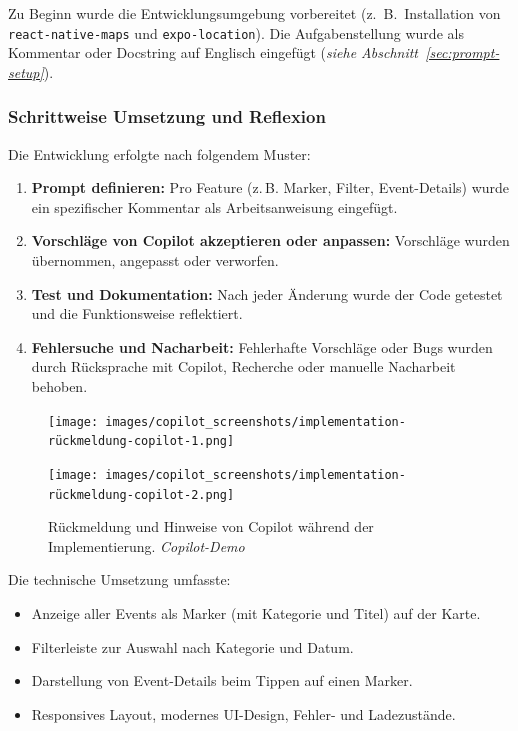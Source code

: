 Zu Beginn wurde die Entwicklungsumgebung vorbereitet (z.~B.\ Installation von
\texttt{react-native-maps} und \texttt{expo-location}). Die Aufgabenstellung
wurde als Kommentar oder Docstring auf Englisch eingefügt (\emph{siehe
      Abschnitt~\ref{sec:prompt-setup}}).

\subsubsection{Schrittweise Umsetzung und Reflexion}
Die Entwicklung erfolgte nach folgendem Muster:
\begin{enumerate}
      \item \textbf{Prompt definieren:} Pro Feature (z.\,B. Marker, Filter, Event-Details) wurde ein spezifischer Kommentar als Arbeitsanweisung eingefügt.
      \item \textbf{Vorschläge von Copilot akzeptieren oder anpassen:} Vorschläge wurden übernommen, angepasst oder verworfen.
      \item \textbf{Test und Dokumentation:} Nach jeder Änderung wurde der Code getestet und die Funktionsweise reflektiert.
      \item \textbf{Fehlersuche und Nacharbeit:} Fehlerhafte Vorschläge oder Bugs wurden durch Rücksprache mit Copilot, Recherche oder manuelle Nacharbeit behoben.
\end{enumerate}

\begin{figure}[htbp]
      \centering
      \begin{minipage}{0.48\textwidth}
            \centering
            \texttt{[image: images/copilot\_screenshots/implementation-rückmeldung-copilot-1.png]}
      \end{minipage}
      \hfill
      \begin{minipage}{0.48\textwidth}
            \centering
            \texttt{[image: images/copilot\_screenshots/implementation-rückmeldung-copilot-2.png]}
      \end{minipage}
      \caption{Rückmeldung und Hinweise von Copilot während der Implementierung. \textit{Copilot-Demo}}
      \label{fig:copilot-impl-pair}
\end{figure}

\noindent Die technische Umsetzung umfasste:
\begin{itemize}
      \item Anzeige aller Events als Marker (mit Kategorie und Titel) auf der Karte.
      \item Filterleiste zur Auswahl nach Kategorie und Datum.
      \item Darstellung von Event-Details beim Tippen auf einen Marker.
      \item Responsives Layout, modernes UI-Design, Fehler- und Ladezustände.
\end{itemize}


